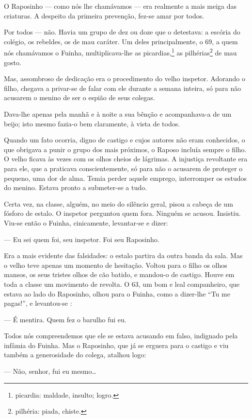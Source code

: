 O Raposinho --- como nós lhe chamávamos --- era realmente a mais meiga
das criaturas. A despeito da primeira prevenção, fez-se amar por todos.

Por todos --- não. Havia um grupo de dez ou doze que o detestava: a
escória do colégio, os rebeldes, os de mau caráter. Um deles
principalmente, o 69, a quem nós chamávamos o Fuinha, multiplicava-lhe
as picardias,\footnote{picardia: maldade, insulto; logro.} as
pilhérias\footnote{pilhéria: piada, chiste.} de mau gosto.

Mas, assombroso de dedicação era o procedimento do velho inspetor.
Adorando o filho, chegava a privar-se de falar com ele durante a semana
inteira, só para não acusarem o menino de ser o espião de seus colegas.

Dava-lhe apenas pela manhã e à noite a sua bênção e acompanhava-a de um
beijo; isto mesmo fazia-o bem claramente, à vista de todos.

Quando um fato ocorria, digno de castigo e cujos autores não eram
conhecidos, o que obrigava a punir o grupo dos mais próximos, o Raposo
incluía sempre o filho. O velho ficava às vezes com os olhos cheios de
lágrimas. A injustiça revoltante era para ele, que a praticava
conscientemente, só para não o acusarem de proteger o pequeno, uma dor
de alma. Temia perder aquele emprego, interromper os estudos do menino.
Estava pronto a submeter-se a tudo.

Certa vez, na classe, alguém, no meio do silêncio geral, pisou a cabeça
de um fósforo de estalo. O inspetor perguntou quem fora. Ninguém se
acusou. Insistiu. Viu-se então o Fuinha, cinicamente, levantar-se e
dizer:

--- Eu sei quem foi, seu inspetor. Foi seu Raposinho.

Era a mais evidente das falsidades: o estalo partira da outra banda da
sala. Mas o velho teve apenas um momento de hesitação. Voltou para o
filho os olhos mansos, os seus tristes olhos de cão batido, e mandou-o
de castigo. Houve em toda a classe um movimento de revolta. O 63, um bom
e leal companheiro, que estava ao lado do Raposinho, olhou para o
Fuinha, como a dizer-lhe ``Tu me pagas!'', e levantou-se :

--- É mentira. Quem fez o barulho fui eu.

Todos nós compreendemos que ele se estava acusando em falso, indignado
pela infâmia do Fuinha. Mas o Raposinho, que já se erguera para o
castigo e viu também a generosidade do colega, atalhou logo:

--- Não, senhor, fui eu mesmo\ldots{}

